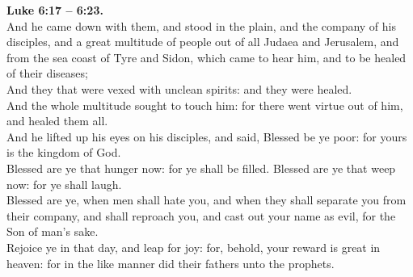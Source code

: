 \documentclass[10pt]{article} %
\begin{document}
{\begin{minipage}[t]{0.45\textwidth}
\textbf{Luke 6:17 -- 6:23.}\\
And he came down with them, and stood in the plain, and the company of his disciples, and a great multitude of people out of all Judaea and Jerusalem, and from the sea coast of Tyre and Sidon, which came to hear him, and to be healed of their diseases;\\
And they that were vexed with unclean spirits: and they were healed.\\
And the whole multitude sought to touch him: for there went virtue out of him, and healed them all.\\
And he lifted up his eyes on his disciples, and said, Blessed be ye poor: for yours is the kingdom of God.\\
Blessed are ye that hunger now: for ye shall be filled. Blessed are ye that weep now: for ye shall laugh.\\
Blessed are ye, when men shall hate you, and when they shall separate you from their company, and shall reproach you, and cast out your name as evil, for the Son of man's sake.\\
Rejoice ye in that day, and leap for joy: for, behold, your reward is great in heaven: for in the like manner did their fathers unto the prophets.\\

\end{minipage}}
\vspace*{\fill}
\newpage
\Huge%
\vspace*{\fill}
\onehalfspacing %
\vspace*{\fill}
\end{document}
